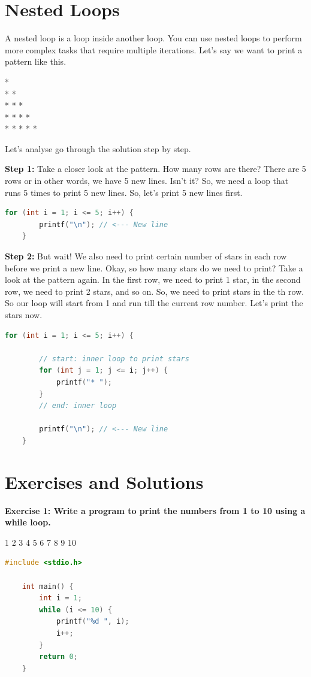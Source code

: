\documentclass[12pt, openany]{book}
\begin{document}
\section{Nested Loops}
A nested loop is a loop inside another loop. You can use nested loops to perform more complex tasks that require multiple iterations. Let's say we want to print a pattern like this.
\begin{tcolorbox}[colback=lightgray!10, colframe=black, title=Output]
    * \\
    * * \\
    * * * \\
    * * * * \\
    * * * * *
\end{tcolorbox}
\noindent Let's analyse go through the solution step by step.

\noindent\textbf{Step 1:} Take a closer look at the pattern. How many rows are there? There are 5 rows or in other words, we have 5 new lines. Isn't it? So, we need a loop that runs 5 times to print 5 new lines. So, let's print 5 new lines first.
\begin{lstlisting}[language=C, gobble=0]
    for (int i = 1; i <= 5; i++) {
        printf("\n"); // <--- New line
    }
\end{lstlisting}

\noindent\textbf{Step 2:} But wait! We also need to print certain number of stars in each row before we print a new line. Okay, so how many stars do we need to print? Take a look at the pattern again. In the first row, we need to print 1 star, in the second row, we need to print 2 stars, and so on. So, we need to print  stars in the th row. So our loop will start from 1 and run till the current row number. Let's print the stars now.
\begin{lstlisting}[language=C, gobble=0]
    for (int i = 1; i <= 5; i++) {

        // start: inner loop to print stars
        for (int j = 1; j <= i; j++) {
            printf("* ");
        }
        // end: inner loop

        printf("\n"); // <--- New line
    }
\end{lstlisting}

\section {Exercises and Solutions}
\textbf{Exercise 1: Write a program to print the numbers from 1 to 10 using a while loop.}
\begin{tcolorbox}[colback=lightgray!10, colframe=black, title=Example Output]
    1 2 3 4 5 6 7 8 9 10
\end{tcolorbox}
\begin{lstlisting}[language=C, gobble=0, caption=Solution to Exercise 1]
    #include <stdio.h>
    
    int main() {
        int i = 1;
        while (i <= 10) {
            printf("%d ", i);
            i++;
        }
        return 0;
    }
\end{lstlisting}
\end{document}
